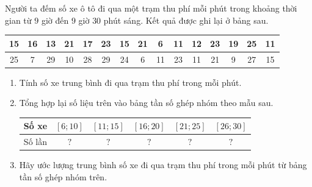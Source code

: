 \begin{ex}%
	Người ta đếm số xe ô tô đi qua một trạm thu phí mỗi phút trong khoảng thời gian từ $9$ giờ đến $9$ giờ $30$ phút sáng. Kết quả được ghi lại ở  bảng sau.
	\begin{center}
		\begin{tabular}{|c|c|c|c|c|c|c|c|c|c|c|c|c|c|c|}
			\hline 15 & 16 & 13 & 21 & 17 & 23 & 15 & 21 & 6 & 11 &  12 & 23 & 19 & 25 & 11 \\
			 \hline 25 & 7 & 29 & 10 & 28 & 29 & 24 & 6 & 11 & 23 & 11 & 21 & 9 & 27 & 15 \\
			\hline 
		\end{tabular}
	\end{center}
	\begin{enumerate}
		\item Tính số xe trung bình đi qua trạm thu phí  trong mỗi phút.
		\item Tổng hợp lại số liệu trên vào bảng tần số ghép nhóm  theo mẫu sau.
		\begin{center}
			\begin{tabular}{|c|c|c|c|c|c|}
				\hline Số xe & $[6; 10]$ & $[11; 15]$ & $[16; 20]$ & $[21; 25]$ & $[26; 30]$ \\ 
				\hline Số lần & $?$ & $?$ & $?$ & $?$ &  $?$ \\
				\hline 
			\end{tabular}
		\end{center}
		\item Hãy ước lượng trung  bình số xe đi qua trạm thu phí trong mỗi phút từ bảng tần số ghép nhóm trên.
	\end{enumerate}
\end{ex}
